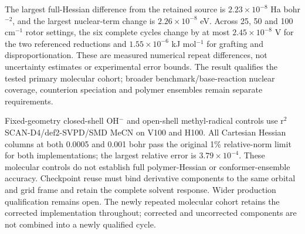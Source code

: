 \documentclass[11pt]{article}
\begin{document}
The largest full-Hessian difference from the retained source is $2.23\times10^{-8}$ Ha bohr$^{-2}$, and the largest nuclear-term change is $2.26\times10^{-8}$ eV. Across 25, 50 and 100 cm$^{-1}$ rotor settings, the six complete cycles change by at most $2.45\times10^{-8}$ V for the two referenced reductions and $1.55\times10^{-6}$ kJ mol$^{-1}$ for grafting and disproportionation. These are measured numerical repeat differences, not uncertainty estimates or experimental error bounds. The result qualifies the tested primary molecular cohort; broader benchmark/base-reaction nuclear coverage, counterion speciation and polymer ensembles remain separate requirements.

\begin{table}[htbp]\centering\small
\caption{Primary-model native repeats for the exact molecular cohort. Frequencies are cm$^{-1}$; FD error is the largest sampled-column relative-norm error in percent. Nuclear changes are maxima over the three rotor cutoffs relative to the retained source. The separate monatomic chloride component has no internal modes or Hessian. All charges and multiplicities are global state assignments.}
\label{tab:primary-native-control}

\end{table}

Fixed-geometry closed-shell OH$^-$ and open-shell methyl-radical controls use r$^2$SCAN-D4/def2-SVPD/SMD MeCN on V100 and H100. All Cartesian Hessian columns at both 0.0005 and 0.001 bohr pass the original 1\% relative-norm limit for both implementations; the largest relative error is $3.79\times10^{-4}$. These molecular controls do not establish full polymer-Hessian or conformer-ensemble accuracy. Checkpoint reuse must bind derivative components to the same orbital and grid frame and retain the complete solvent response. Wider production qualification remains open. The newly repeated molecular cohort retains the corrected implementation throughout; corrected and uncorrected components are not combined into a newly qualified cycle.
\end{document}
